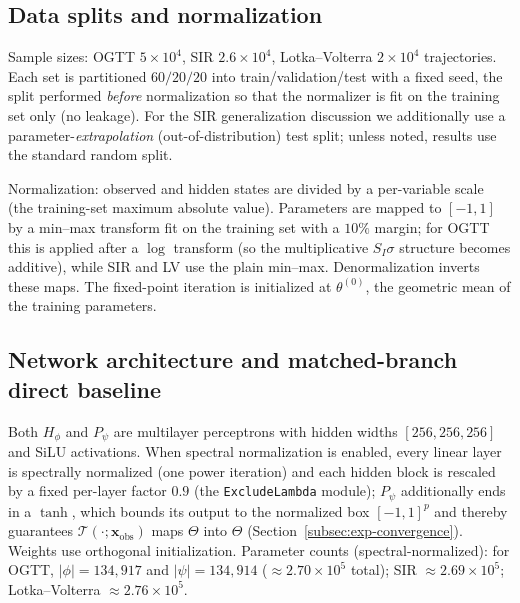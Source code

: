 \subsection{Data splits and normalization}
\label{app:repro-norm}

Sample sizes: OGTT $5\times10^4$, SIR $2.6\times10^4$, Lotka--Volterra $2\times10^4$ trajectories. Each set
is partitioned $60/20/20$ into train/validation/test with a fixed seed, the split performed \emph{before}
normalization so that the normalizer is fit on the training set only (no leakage). For the SIR
generalization discussion we additionally use a parameter-\emph{extrapolation} (out-of-distribution) test
split; unless noted, results use the standard random split.

Normalization: observed and hidden states are divided by a per-variable scale (the training-set maximum
absolute value). Parameters are mapped to $[-1,1]$ by a min--max transform fit on the training set with a
$10\%$ margin; for OGTT this is applied after a $\log$ transform (so the multiplicative $S_I\sigma$
structure becomes additive), while SIR and LV use the plain min--max. Denormalization inverts these maps.
The fixed-point iteration is initialized at $\theta^{(0)}$, the geometric mean of the training parameters.

\subsection{Network architecture and matched-branch direct baseline}
\label{app:repro-arch}

Both $H_\phi$ and $P_\psi$ are multilayer perceptrons with hidden widths $[256,256,256]$ and SiLU
activations. When spectral normalization is enabled, every linear layer is spectrally normalized
(one power iteration) and each hidden block is rescaled by a fixed per-layer factor $0.9$
(the \texttt{ExcludeLambda} module); $P_\psi$ additionally ends in a $\tanh$, which bounds its output to
the normalized box $[-1,1]^p$ and thereby guarantees $\mathcal{T}(\cdot;\mathbf{x}_\mathrm{obs})$ maps
$\Theta$ into $\Theta$ (Section~\ref{subsec:exp-convergence}). Weights use orthogonal initialization.
Parameter counts (spectral-normalized): for OGTT, $|\phi|=134{,}917$ and $|\psi|=134{,}914$
($\approx2.70\times10^5$ total); SIR $\approx2.69\times10^5$; Lotka--Volterra $\approx2.76\times10^5$.

